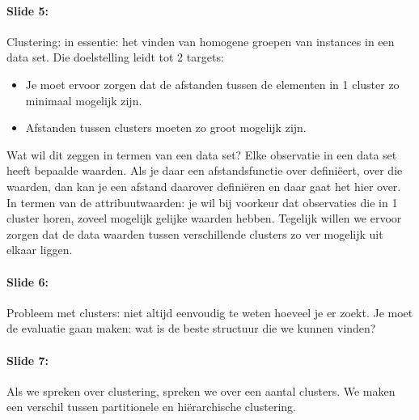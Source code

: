 \documentclass[10pt,a4paper]{report}
\begin{document}
\paragraph{Slide 5:}Clustering: in essentie: het vinden van homogene groepen van instances in een data set. Die doelstelling leidt tot 2 targets:
\begin{itemize}
\item Je moet ervoor zorgen dat de afstanden tussen de elementen in 1 cluster zo minimaal mogelijk zijn.
\item Afstanden tussen clusters moeten zo groot mogelijk zijn.
\end{itemize}
Wat wil dit zeggen in termen van een data set? Elke observatie in een data set heeft bepaalde waarden. Als je daar een afstandsfunctie over defini\"eert, over die waarden, dan kan je een afstand daarover defini\"eren en daar gaat het hier over. In termen van de attribuutwaarden: je wil bij voorkeur dat observaties die in 1 cluster horen, zoveel mogelijk gelijke waarden hebben. Tegelijk willen we ervoor zorgen dat de data waarden tussen verschillende clusters zo ver mogelijk uit elkaar liggen.

\paragraph{Slide 6:}Probleem met clusters: niet altijd eenvoudig te weten hoeveel je er zoekt. Je moet de evaluatie gaan maken: wat is de beste structuur die we kunnen vinden?

\paragraph{Slide 7:}Als we spreken over clustering, spreken we over een aantal clusters. We maken een verschil tussen partitionele en hi\"erarchische clustering.
\end{document}
